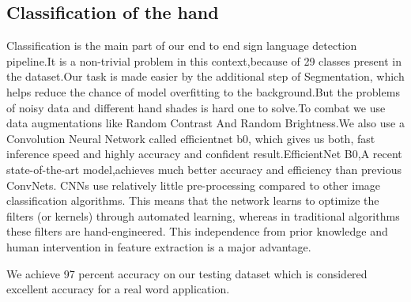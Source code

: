 \documentclass[14pt]{extarticle}
\begin{document}
\begin{multicols}{2}
\begin{figure}[H]
\begin{subfigure}[b]{0.5\textwidth}
                \label{fig:Figure 2}
            \end{subfigure}

        \end{figure}

        \subsection{Classification of the hand}\label{subsec:Classification}
        Classification is the main part of our end to end sign language detection pipeline.It is a non-trivial problem
        in this context,because of  29 classes present in the dataset.Our task is made easier by the additional step
        of Segmentation, which helps reduce the chance of model overfitting to the background.But the problems of noisy
        data and different hand shades is hard one to solve.To combat we use data augmentations like Random Contrast And
        Random Brightness.We also use a Convolution Neural Network called efficientnet b0, which gives us both, fast inference
        speed and highly accuracy and confident result.EfficientNet B0,A recent state-of-the-art model,achieves much better accuracy and efficiency than previous ConvNets.
        CNNs use relatively little pre-processing compared to other image classification algorithms.
        This means that the network learns to optimize the filters (or kernels) through automated learning, whereas in
        traditional algorithms these filters are hand-engineered.
        This independence from prior knowledge and human intervention in feature extraction is a major advantage.

        We achieve 97 percent accuracy on our testing dataset which is considered
        excellent accuracy for a real word application.
        \begin{figure}[H]
            \begin{subfigure}[b]{0.5\textwidth}
                \centering



                \label{fig:Figure 5}
            \end{subfigure}

        \end{figure}
    \end{multicols}
    \begin{figure}[H]
        \begin{subfigure}[b]{0.5\textwidth}
            \centering            {}\label{fig:4}


            \label{fig:Figure 3}
        \end{subfigure}

    \end{figure}
\end{document}
